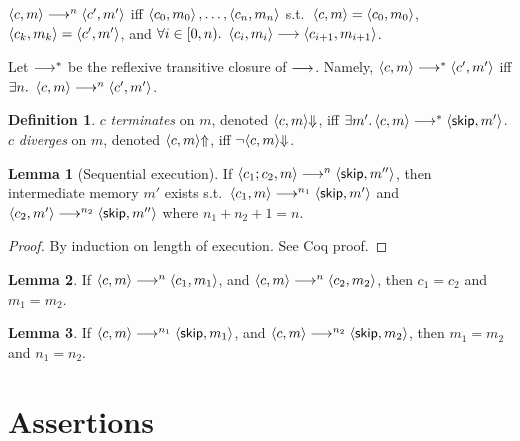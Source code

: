 \documentclass[10pt]{article}
\theoremstyle{definition}
\newtheorem{definition}{Definition}
\newtheorem{lemma}{Lemma}
\begin{document}
$\Cfg(c,m) \sstepston n \Cfg(c',m')$ iff
$\Cfg(c_0,m_0),\dots,\Cfg(c_n,m_n)$
s.t.\ $\Cfg(c,m)=\Cfg(c_0,m_0)$,
$\Cfg(c_k,m_k)=\Cfg(c',m')$,
and $\forall i \in [0,n).\ \Cfg(c_i,m_i) \sstepsto \Cfg(c_{i+1},m_{i+1})$.


Let $\mathrel{\mathrel{\longrightarrow}^{\ast}}$ be the reflexive transitive closure of $\mathrel{\longrightarrow}$. Namely,
$\Cfg(c,m) \sstepstotrans \Cfg(c',m')$ iff
$\exists n.\ \Cfg(c,m) \sstepston n \Cfg(c',m')$.

\begin{definition}
    $c$ \emph{terminates} on $m$, denoted $\Terminate(c,m)$,
    iff $\exists m'. \Cfg(c,m) \sstepstotrans \Cfg(\Skip,m')$.
    $c$ \emph{diverges} on $m$, denoted $\Diverge(c,m)$,
    iff $\neg \Terminate(c,m)$.
\end{definition}

\begin{lemma}[Sequential execution]
    If $\Cfg(c_1; c_2, m) \sstepston n \Cfg(\Skip, m'')$, 
    then intermediate memory $m'$ exists s.t.\
    $\Cfg(c_1, m) \sstepston{n_1} \Cfg(\Skip, m')$
    and $\Cfg(c_2, m') \sstepston{n_2} \Cfg(\Skip, m'')$
    where $n_1+n_2+1=n$.
\end{lemma}
\begin{proof}
    By induction on length of execution. See Coq proof.
\end{proof}

\begin{lemma}
    If $\Cfg(c,m) \sstepston n \Cfg(c_1,m_1)$,
    and $\Cfg(c,m) \sstepston n \Cfg(c_2,m_2)$,
    then $c_1 = c_2$ and $m_1 = m_2$.
\end{lemma}

\begin{lemma}
    If $\Cfg(c,m) \sstepston{n_1} \Cfg(\Skip,m_1)$,
    and $\Cfg(c,m) \sstepston{n_2} \Cfg(\Skip,m_2)$,
    then $m_1 = m_2$ and $n_1 = n_2$.
\end{lemma}

\section{Assertions}

\newcommand*{\domivar}{\mathsf{IVar}}

\newcommand*{\DomAssert}{\mathsf{Assrt}}
\newcommand*{\DomAexpv}{\mathsf{Aexpv}}
\end{document}
